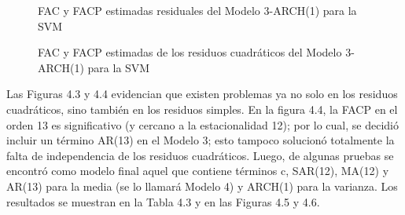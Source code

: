 \begin{figure}[H]
\centering
\caption{FAC y FACP estimadas residuales del Modelo 3-ARCH(1) para la SVM}
\end{figure}

\begin{figure}[H]
\centering
\caption{FAC y FACP estimadas de los residuos cuadr\'{a}ticos del Modelo 3-ARCH(1) para la SVM}
\end{figure}

Las Figuras 4.3 y 4.4 evidencian que existen problemas ya no solo en los 
residuos cuadr\'{a}ticos, sino tambi\'{e}n en los residuos simples. En la 
figura 4.4, la FACP en el orden 13 es significativo (y cercano a la 
estacionalidad 12); por lo cual, se decidi\'{o} incluir un t\'{e}rmino 
AR(13) en el Modelo 3; esto tampoco solucion\'{o} totalmente la falta de 
independencia de los residuos cuadr\'{a}ticos. Luego, de algunas pruebas se 
encontr\'{o} como modelo final aquel que contiene t\'{e}rminos c, SAR(12), 
MA(12) y AR(13) para la media (se lo llamar\'{a} Modelo 4) y ARCH(1) para la 
varianza. Los resultados se muestran en la Tabla 4.3 y en las Figuras 4.5 y 
4.6. 